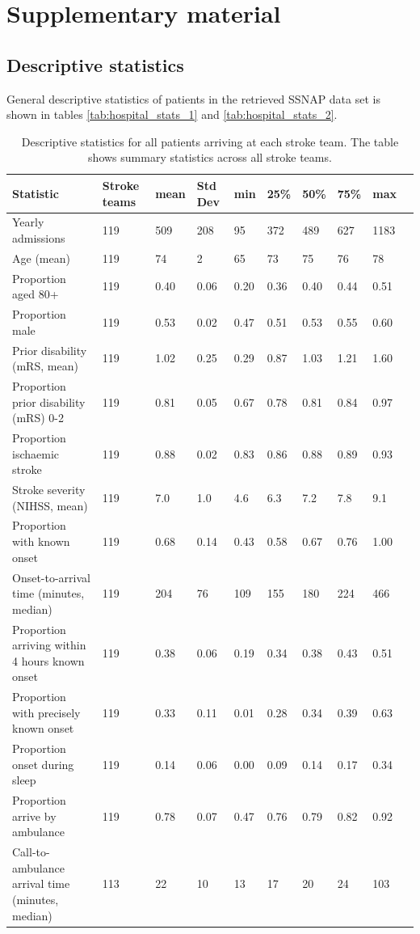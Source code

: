 \section{Supplementary material}

\subsection{Descriptive statistics}

General descriptive statistics of patients in the retrieved SSNAP data set is shown in tables \ref{tab:hospital_stats_1} and \ref{tab:hospital_stats_2}.

\small
\renewcommand{\arraystretch}{1.3}
\begin{longtable}{p{7cm} p{1cm} p{0.8cm} p{0.8cm} p{0.8cm} p{0.8cm} p{0.8cm} p{0.8cm} p{0.8cm} p{0.8cm}}
\caption{Descriptive statistics for all patients arriving at each stroke team. The table shows summary statistics across all stroke teams.}\\
\toprule
\endhead
Statistic & Stroke teams & mean & Std Dev & min & 25\% & 50\% & 75\% & max\tabularnewline
\midrule
Yearly admissions & 119 & 509 & 208 & 95 & 372 & 489 & 627 & 1183\tabularnewline
Age (mean) & 119 & 74 & 2 & 65 & 73 & 75 & 76 & 78\tabularnewline
Proportion aged 80+ & 119 & 0.40 & 0.06 & 0.20 & 0.36 & 0.40 & 0.44 & 0.51\tabularnewline
Proportion male & 119 & 0.53 & 0.02 & 0.47 & 0.51 & 0.53 & 0.55 & 0.60\tabularnewline
Prior disability (mRS, mean) & 119 & 1.02 & 0.25 & 0.29 & 0.87 & 1.03 & 1.21 & 1.60\tabularnewline
Proportion prior disability (mRS) 0-2 & 119 & 0.81 & 0.05 & 0.67 & 0.78 & 0.81 & 0.84 & 0.97\tabularnewline
Proportion ischaemic stroke & 119 & 0.88 & 0.02 & 0.83 & 0.86 & 0.88 & 0.89 & 0.93\tabularnewline
Stroke severity (NIHSS, mean) & 119 & 7.0 & 1.0 & 4.6 & 6.3 & 7.2 & 7.8 & 9.1\tabularnewline
Proportion with known onset & 119 & 0.68 & 0.14 & 0.43 & 0.58 & 0.67 & 0.76 & 1.00\tabularnewline
Onset-to-arrival time (minutes, median) & 119 & 204 & 76 & 109 & 155 & 180 & 224 & 466\tabularnewline
Proportion arriving within 4 hours known onset & 119 & 0.38 & 0.06 & 0.19 & 0.34 & 0.38 & 0.43 & 0.51\tabularnewline
Proportion with precisely known onset & 119 & 0.33 & 0.11 & 0.01 & 0.28 & 0.34 & 0.39 & 0.63\tabularnewline
Proportion onset during sleep & 119 & 0.14 & 0.06 & 0.00 & 0.09 & 0.14 & 0.17 & 0.34\tabularnewline
Proportion arrive by ambulance & 119 & 0.78 & 0.07 & 0.47 & 0.76 & 0.79 & 0.82 & 0.92\tabularnewline
Call-to-ambulance arrival time (minutes, median) & 113 & 22 & 10 & 13 & 17 & 20 & 24 & 103\tabularnewline

\end{longtable}
